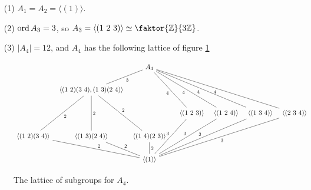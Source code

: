 \begin{example}\label{example_3.14}
  \begin{enumerate}
    \item[(1)] $A_1=A_2=\langle (1) \rangle$.

    \item[(2)] $\operatorname{ord}{A_3}=3$, so $A_3=\langle (1 \ 2 \ 3) \rangle \simeq
      \faktor{\Z}{3\Z}$.

    \item[(3)] $|A_4|=12$, and $A_4$ has the following lattice of figure
      \ref{figure_3.5}
  \end{enumerate}
\end{example}

\begin{figure}[h]
  \[\begin{tikzcd}[column sep=tiny]
  && {A_4} \\
  & {\langle (1 \ 2)(3 \ 4),(1 \ 3)(2 \ 4) \rangle} \\
  &&&& {\langle (1 \ 2 \ 3) \rangle} & {\langle (1 \ 2 \ 4) \rangle} & {\langle (1 \ 3 \ 4) \rangle} & {\langle (2 \ 3 \ 4) \rangle} \\
    {\langle (1 \ 2)(3 \ 4) \rangle} & {\langle (1 \ 3)(2 \ 4) \rangle} & {\langle (1 \ 4)(2 \ 3) \rangle} \\
                                     && {\langle (1) \rangle}
                                     \arrow["4"', no head, from=1-3, to=3-5]
                                     \arrow["4"', no head, from=1-3, to=3-6]
                                     \arrow["4"', no head, from=1-3, to=3-7]
                                     \arrow["4"', no head, from=1-3, to=3-8]
                                     \arrow["3", no head, from=3-8, to=5-3]
                                     \arrow["3"', no head, from=3-7, to=5-3]
                                     \arrow["3"', no head, from=3-6, to=5-3]
                                     \arrow["3"', no head, from=3-5, to=5-3]
                                     \arrow["2", no head, from=4-2, to=5-3]
                                     \arrow["2", no head, from=4-1, to=5-3]
                                     \arrow["2", no head, from=4-3, to=5-3]
                                     \arrow["3", no head, from=1-3, to=2-2]
                                     \arrow["2", no head, from=2-2, to=4-2]
                                     \arrow["2", no head, from=2-2, to=4-3]
                                     \arrow["2", no head, from=2-2, to=4-1]
  \end{tikzcd}\]
  \caption{The lattice of subgroups for $A_4$.}
  \label{figure_3.5}
\end{figure}
